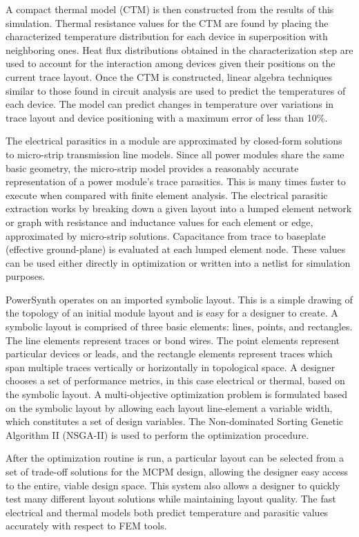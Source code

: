 \documentclass[11pt]{article}
\begin{document}
A compact thermal model (CTM) is then constructed from the results of this simulation. Thermal resistance values for the CTM are found by placing the characterized temperature distribution for each device in superposition with neighboring ones. Heat flux distributions obtained in the characterization step are used to account for the interaction among devices given their positions on the current trace layout. Once the CTM is constructed, linear algebra techniques similar to those found in circuit analysis are used to predict the temperatures of each device. The model can predict changes in temperature over variations in trace layout and device positioning with a maximum error of less than 10\%. 

The electrical parasitics in a module are approximated by closed-form solutions to micro-strip transmission line models. Since all power modules share the same basic geometry, the micro-strip model provides a reasonably accurate representation of a power module’s trace parasitics. This is many times faster to execute when compared with finite element analysis. The electrical parasitic extraction works by breaking down a given layout into a lumped element network or graph with resistance and inductance values for each element or edge, approximated by micro-strip solutions. Capacitance from trace to baseplate (effective ground-plane) is evaluated at each lumped element node. These values can be used either directly in optimization or written into a netlist for simulation purposes. 

PowerSynth operates on an imported symbolic layout. This is a simple drawing of the topology of an initial module layout and is easy for a designer to create. A symbolic layout is comprised of three basic elements: lines, points, and rectangles. The line elements represent traces or bond wires. The point elements represent particular devices or leads, and the rectangle elements represent traces which span multiple traces vertically or horizontally in topological space. 
A designer chooses a set of performance metrics, in this case electrical or thermal, based on the symbolic layout. A multi-objective optimization problem is formulated based on the symbolic layout by allowing each layout line-element a variable width, which constitutes a set of design variables. The Non-dominated Sorting Genetic Algorithm II (NSGA-II) is used to perform the optimization procedure.

After the optimization routine is run, a particular layout can be selected from a set of trade-off solutions for the MCPM design, allowing the designer easy access to the entire, viable design space. This system also allows a designer to quickly test many different layout solutions while maintaining layout quality. The fast electrical and thermal models both predict temperature and parasitic values accurately with respect to FEM tools. 
\end{document}
